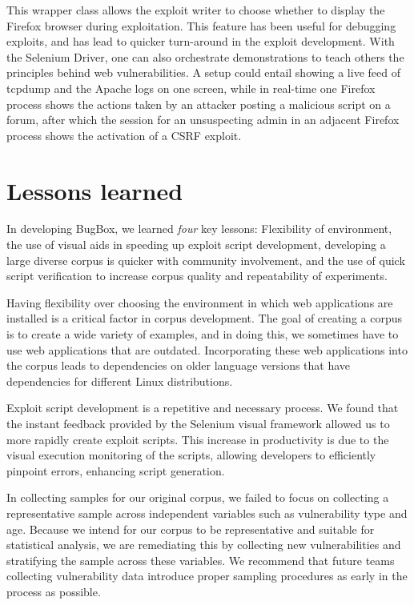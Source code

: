 \documentclass[letterpaper,twocolumn,10pt]{article}
\begin{document}
This wrapper class allows the exploit writer to choose whether to display the Firefox browser during exploitation. This feature has been useful for debugging exploits, and has lead to quicker turn-around in the exploit development. With the Selenium Driver, one can also orchestrate demonstrations to teach others the principles behind web vulnerabilities.  A setup could entail showing a live feed of tcpdump and the Apache logs on one screen, while in real-time one Firefox process shows the actions taken by an attacker posting a malicious script on a forum, after which the session for an unsuspecting admin in an adjacent Firefox process shows the activation of a CSRF exploit. 

\section {Lessons learned}

In developing BugBox, we learned {\em four} key lessons: Flexibility of environment, the use of visual aids in speeding up exploit script development, developing a large diverse corpus is quicker with community involvement, and the use of quick script verification to increase corpus quality and repeatability of experiments.\par

Having flexibility over choosing the environment in which web applications are installed is a critical factor in corpus development.  The goal of creating a corpus is to create a wide variety of examples, and in doing this, we sometimes have to use web applications that are outdated.  Incorporating these web applications into the corpus leads to dependencies on older language versions that have dependencies for different Linux distributions.\par

Exploit script development is a repetitive and necessary process. We found that the instant feedback provided by the Selenium visual framework allowed us to more rapidly create exploit scripts.  This increase in productivity is due to the visual execution monitoring of the scripts, allowing developers to efficiently pinpoint errors, enhancing script generation.  \par

In collecting samples for our original corpus, we failed to focus on collecting a representative sample across independent variables such as vulnerability type and age. Because we intend for our corpus to be representative and suitable for statistical analysis, we are remediating this by collecting new vulnerabilities and stratifying the sample across these variables. We recommend that future teams collecting vulnerability data introduce proper sampling procedures as early in the process as possible.\par
\end{document}
